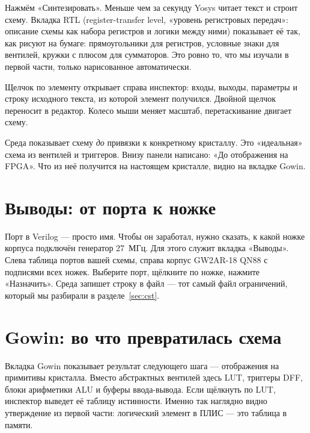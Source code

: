 Нажмём «Синтезировать». Меньше чем за секунду Yosys читает текст и строит
схему. Вкладка RTL (register-transfer level, «уровень регистровых передач»:
описание схемы как набора регистров и логики между ними) показывает её так,
как рисуют на бумаге: прямоугольники для регистров, условные знаки для
вентилей, кружки с плюсом для сумматоров. Это ровно то, что мы изучали в
первой части, только нарисованное автоматически.


Щелчок по элементу открывает справа инспектор: входы, выходы, параметры и
строку исходного текста, из которой элемент получился. Двойной щелчок
переносит в редактор. Колесо мыши меняет масштаб, перетаскивание двигает схему.

\begin{ideabox}
Среда показывает схему \emph{до} привязки к конкретному кристаллу. Это
«идеальная» схема из вентилей и триггеров. Внизу панели написано: «До
отображения на FPGA». Что из неё получится на настоящем кристалле, видно на
вкладке Gowin.
\end{ideabox}

\section{Выводы: от порта к ножке}

Порт  в Verilog --- просто имя. Чтобы он заработал, нужно сказать,
к какой ножке корпуса подключён генератор 27~МГц. Для этого служит вкладка
«Выводы». Слева таблица портов вашей схемы, справа корпус GW2AR-18 QN88 с
подписями всех ножек. Выберите порт, щёлкните по ножке, нажмите «Назначить».
Среда запишет строку  в файл  --- тот самый файл
ограничений, который мы разбирали в разделе~\ref{sec:cst}.


\section{Gowin: во что превратилась схема}

Вкладка Gowin показывает результат следующего шага --- отображения на
примитивы кристалла. Вместо абстрактных вентилей здесь LUT, триггеры DFF,
блоки арифметики ALU и буферы ввода-вывода. Если щёлкнуть по LUT, инспектор
выведет её таблицу истинности. Именно так наглядно видно утверждение из
первой части: логический элемент в ПЛИС --- это таблица в памяти.

